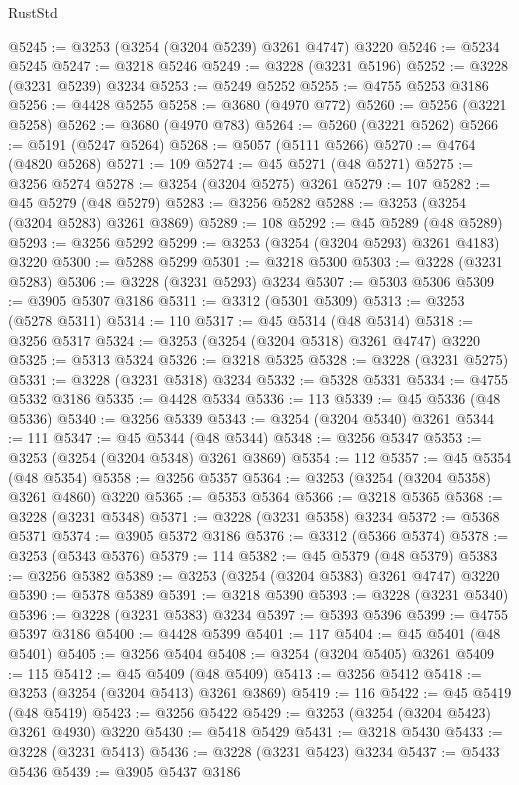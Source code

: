 \begin{lexlean}{RustStd}
\begin{coremodule}
@5245 := @3253 (@3254 (@3204 @5239) @3261 @4747) @3220
@5246 := @5234 @5245
@5247 := @3218 @5246
@5249 := @3228 (@3231 @5196)
@5252 := @3228 (@3231 @5239) @3234
@5253 := @5249 @5252
@5255 := @4755 @5253 @3186
@5256 := @4428 @5255
@5258 := @3680 (@4970 @772)
@5260 := @5256 (@3221 @5258)
@5262 := @3680 (@4970 @783)
@5264 := @5260 (@3221 @5262)
@5266 := @5191 (@5247 @5264)
@5268 := @5057 (@5111 @5266)
@5270 := @4764 (@4820 @5268)
@5271 := 109
@5274 := @45 @5271 (@48 @5271)
@5275 := @3256 @5274
@5278 := @3254 (@3204 @5275) @3261
@5279 := 107
@5282 := @45 @5279 (@48 @5279)
@5283 := @3256 @5282
@5288 := @3253 (@3254 (@3204 @5283) @3261 @3869)
@5289 := 108
@5292 := @45 @5289 (@48 @5289)
@5293 := @3256 @5292
@5299 := @3253 (@3254 (@3204 @5293) @3261 @4183) @3220
@5300 := @5288 @5299
@5301 := @3218 @5300
@5303 := @3228 (@3231 @5283)
@5306 := @3228 (@3231 @5293) @3234
@5307 := @5303 @5306
@5309 := @3905 @5307 @3186
@5311 := @3312 (@5301 @5309)
@5313 := @3253 (@5278 @5311)
@5314 := 110
@5317 := @45 @5314 (@48 @5314)
@5318 := @3256 @5317
@5324 := @3253 (@3254 (@3204 @5318) @3261 @4747) @3220
@5325 := @5313 @5324
@5326 := @3218 @5325
@5328 := @3228 (@3231 @5275)
@5331 := @3228 (@3231 @5318) @3234
@5332 := @5328 @5331
@5334 := @4755 @5332 @3186
@5335 := @4428 @5334
@5336 := 113
@5339 := @45 @5336 (@48 @5336)
@5340 := @3256 @5339
@5343 := @3254 (@3204 @5340) @3261
@5344 := 111
@5347 := @45 @5344 (@48 @5344)
@5348 := @3256 @5347
@5353 := @3253 (@3254 (@3204 @5348) @3261 @3869)
@5354 := 112
@5357 := @45 @5354 (@48 @5354)
@5358 := @3256 @5357
@5364 := @3253 (@3254 (@3204 @5358) @3261 @4860) @3220
@5365 := @5353 @5364
@5366 := @3218 @5365
@5368 := @3228 (@3231 @5348)
@5371 := @3228 (@3231 @5358) @3234
@5372 := @5368 @5371
@5374 := @3905 @5372 @3186
@5376 := @3312 (@5366 @5374)
@5378 := @3253 (@5343 @5376)
@5379 := 114
@5382 := @45 @5379 (@48 @5379)
@5383 := @3256 @5382
@5389 := @3253 (@3254 (@3204 @5383) @3261 @4747) @3220
@5390 := @5378 @5389
@5391 := @3218 @5390
@5393 := @3228 (@3231 @5340)
@5396 := @3228 (@3231 @5383) @3234
@5397 := @5393 @5396
@5399 := @4755 @5397 @3186
@5400 := @4428 @5399
@5401 := 117
@5404 := @45 @5401 (@48 @5401)
@5405 := @3256 @5404
@5408 := @3254 (@3204 @5405) @3261
@5409 := 115
@5412 := @45 @5409 (@48 @5409)
@5413 := @3256 @5412
@5418 := @3253 (@3254 (@3204 @5413) @3261 @3869)
@5419 := 116
@5422 := @45 @5419 (@48 @5419)
@5423 := @3256 @5422
@5429 := @3253 (@3254 (@3204 @5423) @3261 @4930) @3220
@5430 := @5418 @5429
@5431 := @3218 @5430
@5433 := @3228 (@3231 @5413)
@5436 := @3228 (@3231 @5423) @3234
@5437 := @5433 @5436
@5439 := @3905 @5437 @3186

\end{coremodule}
\end{lexlean}
